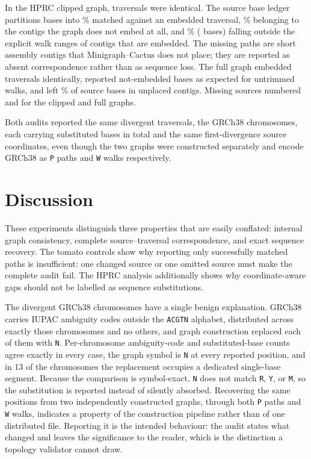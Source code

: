 \documentclass[10pt]{article}
\begin{document}
In the HPRC clipped graph, \HprcClippedIdentical{} traversals were identical.
The source base ledger partitions \HprcClippedSourceBases{} bases into
\HprcEmbeddedPercent{}\% matched against an embedded traversal,
\HprcClippedMissingPathPercent{}\% belonging to the \HprcClippedMissingPath{}
contigs the graph does not embed at all, and \HprcClippedNotEmbeddedPercent{}\%
(\HprcNotEmbedded{} bases) falling outside the explicit walk ranges of contigs
that are embedded. The missing paths are short assembly contigs that
Minigraph--Cactus does not place; they are reported as absent correspondence
rather than as sequence loss. The full graph embedded \HprcFullIdentical{}
traversals identically, reported \HprcFullNotEmbedded{} not-embedded bases as
expected for untrimmed walks, and left \HprcFullMissingPathPercent{}\% of source
bases in unplaced contigs. Missing sources numbered \HprcClippedMissingSource{}
and \HprcFullMissingSource{} for the clipped and full graphs.

Both audits reported the same \HprcClippedDivergent{} divergent traversals, the
GRCh38 chromosomes, each carrying \HprcClippedSubstituted{} substituted bases in
total and the same first-divergence source coordinates, even though the two
graphs were constructed separately and encode GRCh38 as \texttt{P} paths and
\texttt{W} walks respectively.

\section{Discussion}

These experiments distinguish three properties that are easily conflated:
internal graph consistency, complete source--traversal correspondence, and exact
sequence recovery. The tomato controls show why reporting only successfully
matched paths is insufficient: one changed source or one omitted source must
make the complete audit fail. The HPRC analysis additionally shows why
coordinate-aware gaps should not be labelled as sequence substitutions.

The \HprcClippedDivergent{} divergent GRCh38 chromosomes have a single benign
explanation. GRCh38 carries \HprcClippedSubstituted{} IUPAC ambiguity codes
outside the \texttt{ACGTN} alphabet, distributed across exactly those
\HprcClippedDivergent{} chromosomes and no others, and graph construction
replaced each of them with \texttt{N}. Per-chromosome ambiguity-code and
substituted-base counts agree exactly in every case, the graph symbol is
\texttt{N} at every reported position, and in 13 of the
\HprcClippedDivergent{} chromosomes the replacement occupies a dedicated
single-base segment. Because the comparison is symbol-exact, \texttt{N} does not
match \texttt{R}, \texttt{Y}, or \texttt{M}, so the substitution is reported
instead of silently absorbed. Recovering the same \HprcClippedSubstituted{}
positions from two independently constructed graphs, through both \texttt{P}
paths and \texttt{W} walks, indicates a property of the construction pipeline
rather than of one distributed file. Reporting it is the intended behaviour: the
audit states what changed and leaves the significance to the reader, which is the
distinction a topology validator cannot draw.
\end{document}

